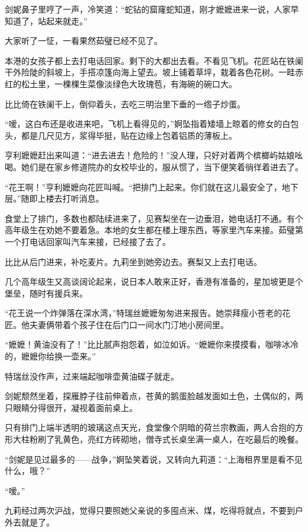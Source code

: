 \par 剑妮鼻子里哼了一声，冷笑道：“蛇钻的窟窿蛇知道，刚才嬷嬷进来一说，人家早知道了，站起来就走。”
\par 大家听了一怔，一看果然茹璧已经不见了。
\par 本港的女孩子都上去打电话回家。剩下的大都出去看。不看见飞机。花匠站在铁阑干外险陡的斜坡上，手搭凉篷向海上望去。坡上铺着草坪，栽着各色花树。一畦赤红的松土里，一棵棵生菜像淡绿色大玫瑰苞，有海碗的碗口大。
\par 比比倚在铁阑干上，倒仰着头，去吃三明治里下垂的一绺子炒蛋。
\par “嗳，这白布还是收进来吧，飞机上看得见的，”婀坠指着矮墙上晾着的修女的白包头，都是几尺见方，浆得毕挺，贴在边缘上包着铝质的薄板上。
\par 亨利嬷嬷赶出来叫道：“进去进去！危险的！”没人理，只好对着两个槟榔屿姑娘吆喝。她们是在家乡修道院办的女校毕业的，服从惯了，当下便笑着徜徉着进去了。
\par “花王啊！”亨利嬷嬷向花匠叫喊。“把排门上起来。你们就在这儿最安全了，地下层。”随即上楼去打听消息。
\par 食堂上了排门，多数也都陆续进来了，见赛梨坐在一边垂泪，她电话打不通。有个高年级生在劝她不要着急。本地的女生都在楼上理东西，等家里汽车来接。茹璧第一个打电话回家叫汽车来接，已经接了去了。
\par 比比从后门进来，补吃麦片。九莉坐到她旁边去。赛梨又上去打电话。
\par 几个高年级生又高谈阔论起来，说日本人敢来正好，香港有准备的，星加坡更是个堡垒，随时有援兵来。
\par “花王说一个炸弹落在深水湾，”特瑞丝嬷嬷匆匆进来报告。她崇拜瘦小苍老的花匠。他夫妻俩带着个孩子住在后门口一间水门汀地小房间里。
\par “嬷嬷！黄油没有了！”比比腻声抱怨着，如泣如诉。“嬷嬷你来摸摸看，咖啡冰冷的，嬷嬷你给换一壶来。”
\par 特瑞丝没作声，过来端起咖啡壶黄油碟子就走。
\par 剑妮颓然坐着，探雁脖子往前伸着点，苍黄的鹅蛋脸越发面如土色，土偶似的，两只眼睛分得很开，凝视着面前桌上。
\par 只有排门上端半透明的玻璃这点天光，食堂像个阴暗的荷兰宗教画，两人合抱的方形大柱粉刷了乳黄色，亮红方砖砌地，僧寺式长桌坐满一桌人，在吃最后的晚餐。
\par “剑妮是见过最多的——战争，”婀坠笑着说，又转向九莉道：“上海租界里是看不见什么，哦？”
\par “嗳。”
\par 九莉经过两次沪战，觉得只要照她父亲说的多囤点米、煤，吃得将就点，不要到户外去就是了。

